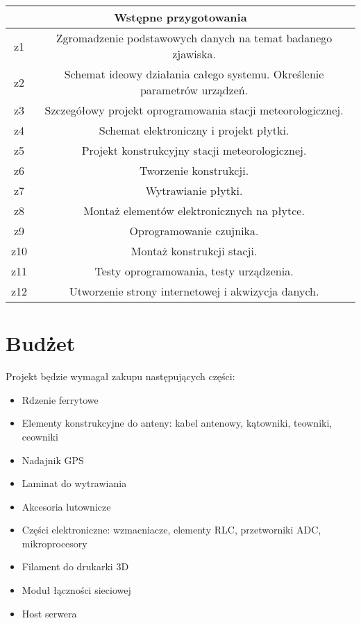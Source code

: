 \documentclass[12pt]{article}
\begin{document}
\begin{table}[!h]
\centering
\begin{tabular}{|c|c|}
\hline 
\multicolumn{2}{|c|}{\large{Wstępne przygotowania}} \\
\hline 
z1 & Zgromadzenie podstawowych danych na temat badanego zjawiska. \\ 
\hline 
z2 & Schemat ideowy działania całego systemu. Określenie parametrów urządzeń. \\ 
\hline 
z3 & Szczegółowy projekt oprogramowania stacji meteorologicznej. \\ 
\hline 
z4 & Schemat elektroniczny i projekt płytki. \\ 
\hline 
z5 & Projekt konstrukcyjny stacji meteorologicznej. \\ 
\hline 
z6 & Tworzenie konstrukcji. \\
\hline 
z7 & Wytrawianie płytki. \\
\hline 
z8 & Montaż elementów elektronicznych na płytce. \\
\hline 
z9 & Oprogramowanie czujnika. \\
\hline
z10 & Montaż konstrukcji stacji. \\
\hline
z11 & Testy oprogramowania, testy urządzenia. \\
\hline
z12 & Utworzenie strony internetowej i akwizycja danych. \\
\hline

\end{tabular}
\end{table}

\newpage

\section{Budżet}
Projekt będzie wymagał zakupu następujących części:
\begin{itemize}
\item Rdzenie ferrytowe
\item Elementy konstrukcyjne do anteny: kabel antenowy, kątowniki, teowniki, ceowniki
\item Nadajnik GPS
\item Laminat do wytrawiania
\item Akcesoria lutownicze
\item Części elektroniczne: wzmacniacze, elementy RLC, przetworniki ADC, mikroprocesory
\item Filament do drukarki 3D
\item Moduł łączności sieciowej
\item Host serwera
\end{itemize}
\end{document}
